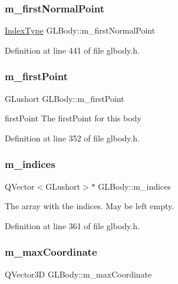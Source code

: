 \subsubsection{\texorpdfstring{m\_firstNormalPoint}{m\_firstNormalPoint}}
{\footnotesize\ttfamily \mbox{\hyperlink{gldefines_8h_af3c748960f29c42e5b7f1dc449ab66ff}{Index\+Type}} G\+L\+Body\+::m\+\_\+first\+Normal\+Point\hspace{0.3cm}{\ttfamily [protected]}}



Definition at line 441 of file glbody.\+h.

\mbox{\label{class_g_l_body_abaf51ac1970735fdc27e861e0276d059}} 
\subsubsection{\texorpdfstring{m\_firstPoint}{m\_firstPoint}}
{\footnotesize\ttfamily G\+Lushort G\+L\+Body\+::m\+\_\+first\+Point\hspace{0.3cm}{\ttfamily [protected]}}



first\+Point The first\+Point for this body 



Definition at line 352 of file glbody.\+h.

\mbox{\label{class_g_l_body_a0ac1c7cdd34662989db4204735f05aca}} 
\subsubsection{\texorpdfstring{m\_indices}{m\_indices}}
{\footnotesize\ttfamily Q\+Vector$<$G\+Lushort$>$$\ast$ G\+L\+Body\+::m\+\_\+indices\hspace{0.3cm}{\ttfamily [protected]}}

The array with the indices. May be left empty. 

Definition at line 361 of file glbody.\+h.

\mbox{\label{class_g_l_body_aa92b3be1a0e0f852e7a19ce55fd8c1b1}} 
\subsubsection{\texorpdfstring{m\_maxCoordinate}{m\_maxCoordinate}}
{\footnotesize\ttfamily Q\+Vector3D G\+L\+Body\+::m\+\_\+max\+Coordinate\hspace{0.3cm}{\ttfamily [protected]}}



